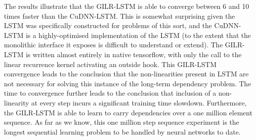 \documentclass{article}
\begin{document}
The results illustrate that the GILR-LSTM is able to converge between 6 and 10
times faster than the CuDNN-LSTM. This is somewhat surprising
given the LSTM was specifically constructed for problems of this sort, and the
CuDNN-LSTM is a highly-optimised implementation of the LSTM (to the extent that
the monolithic interface it exposes is difficult to understand or extend). The
GILR-LSTM is written almost entirely in native tensorflow, with only the call to
the linear recurrence kernel activating an outside hook. This GILR-LSTM
convergence leads to the conclusion that the non-linearities present in LSTM are
not necessary for solving this instance of the long-term dependency problem.
The time to convergence further leads to the conclusion that inclusion of a
non-linearity at every step incurs a significant training time slowdown.
Furthermore, the GILR-LSTM is able to learn to carry dependencies over a one
million element sequence. As far as we know, this one million step sequence
experiment is the longest sequential learning problem to be handled by neural
networks to date.
\end{document}
